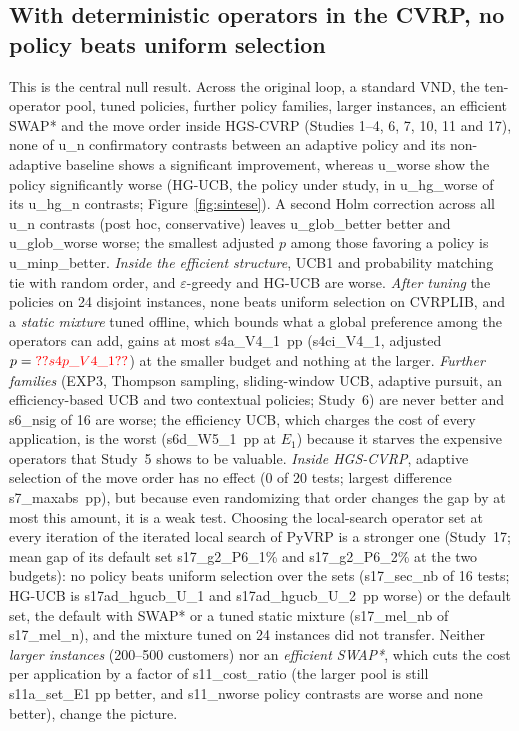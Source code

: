 \subsection{With deterministic operators in the CVRP, no policy beats uniform selection}\label{sec:r3}
This is the central null result. Across the original loop, a standard VND, the ten-operator pool, tuned policies, further policy families, larger instances, an efficient SWAP* and the move order inside HGS-CVRP (Studies 1--4, 6, 7, 10, 11 and 17), none of \num{u_n} confirmatory contrasts between an adaptive policy and its non-adaptive baseline shows a significant improvement, whereas \num{u_worse} show the policy significantly worse (HG-UCB, the policy under study, in \num{u_hg_worse} of its \num{u_hg_n} contrasts; Figure~\ref{fig:sintese}). A second Holm correction across all \num{u_n} contrasts (post hoc, conservative) leaves \num{u_glob_better} better and \num{u_glob_worse} worse; the smallest adjusted $p$ among those favoring a policy is \num{u_minp_better}. \emph{Inside the efficient structure}, UCB1 and probability matching tie with random order, and $\varepsilon$-greedy and HG-UCB are worse. \emph{After tuning} the policies on 24 disjoint instances, none beats uniform selection on CVRPLIB, and a \emph{static mixture} tuned offline, which bounds what a global preference among the operators can add, gains at most \num{s4a_V4_1}~pp (\num{s4ci_V4_1}, adjusted $p=\num{s4p_V4_1}$) at the smaller budget and nothing at the larger. \emph{Further families} (EXP3, Thompson sampling, sliding-window UCB, adaptive pursuit, an efficiency-based UCB and two contextual policies; Study~6) are never better and \num{s6_nsig} of 16 are worse; the efficiency UCB, which charges the cost of every application, is the worst (\num{s6d_W5_1}~pp at $E_1$) because it starves the expensive operators that Study~5 shows to be valuable. \emph{Inside HGS-CVRP}, adaptive selection of the move order has no effect (0 of 20 tests; largest difference \num{s7_maxabs}~pp), but because even randomizing that order changes the gap by at most this amount, it is a weak test. Choosing the local-search operator set at every iteration of the iterated local search of PyVRP is a stronger one (Study~17; mean gap of its default set \num{s17_g2_P6_1}\% and \num{s17_g2_P6_2}\% at the two budgets): no policy beats uniform selection over the sets (\num{s17_sec_nb} of 16 tests; HG-UCB is \num{s17ad_hgucb_U_1} and \num{s17ad_hgucb_U_2}~pp worse) or the default set, the default with SWAP* or a tuned static mixture (\num{s17_mel_nb} of \num{s17_mel_n}), and the mixture tuned on 24 instances did not transfer. Neither \emph{larger instances} (200--500 customers) nor an \emph{efficient SWAP*}, which cuts the cost per application by a factor of \num{s11_cost_ratio} (the larger pool is still \num{s11a_set_E1} pp better, and \num{s11_nworse} policy contrasts are worse and none better), change the picture.

